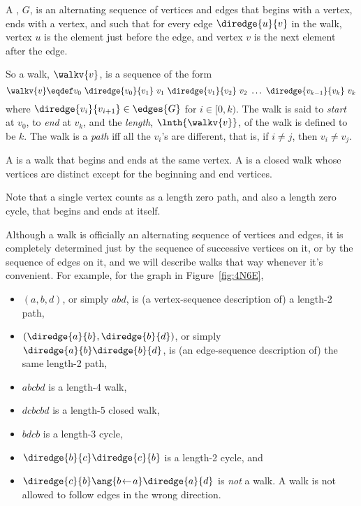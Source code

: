 \begin{definition}\label{def:digraph-walks}
A , $G$, is an alternating sequence of
vertices and edges that begins with a vertex, ends with a vertex, and
such that for every edge $\diredge{u}{v}$ in the walk, vertex $u$ is
the element just before the edge, and vertex $v$ is the next element
after the edge.

So a walk, $\walkv{v}$, is a sequence of the form
\[
\walkv{v} \eqdef v_0\ \diredge{v_0}{v_1}\
v_1\  \diredge{v_1}{v_2}\  v_2\  \dots\  \diredge{v_{k-1}}{v_k}\  v_k
\]
where $\diredge{v_i}{v_{i+1}} \in \edges{G}$ for $i \in [0,k)$.
  The walk is said to \emph{start} at $v_0$, to \emph{end} at $v_k$,
  and the \emph{length}, $\lnth{\walkv{v}}$, of the walk is defined to be
  $k$.  The walk is a \emph{path} iff all the $v_i$'s are different,
  that is, if $i \neq j$, then $v_i \neq v_j$.

A  is a walk that begins and ends at the same
vertex.  A  is a closed walk whose vertices are distinct
except for the beginning and end vertices.
\end{definition}
Note that a single vertex counts as a length zero path, and also a
length zero cycle, that begins and ends at itself.

Although a walk is officially an alternating sequence of vertices and
edges, it is completely determined just by the sequence of successive
vertices on it, or by the sequence of edges on it, and we will
describe walks that way whenever it's convenient.  For example, for
the graph in Figure~\ref{fig:4N6E},
\begin{itemize}

\item $(a, b, d)$, or simply $abd$, is (a vertex-sequence description
  of) a length-2 path,

\item $(\diredge{a}{b}, \diredge{b}{d})$, or simply
  $\diredge{a}{b}\diredge{b}{d}$, is (an edge-sequence description of)
  the same length-2 path,

\item $abcbd$ is a length-4 walk,

\item $dcbcbd$ is a length-5 closed walk,

\item $bdcb$ is a length-3 cycle,

\item $\diredge{b}{c}\diredge{c}{b}$ is a length-2 cycle, and

\item $\diredge{c}{b}\ang{b\! \leftarrow\! a}\diredge{a}{d}$
  is \emph{not} a walk.  A walk is not allowed to follow
  edges in the wrong direction.
\end{itemize}

